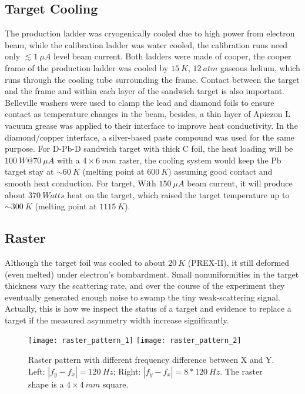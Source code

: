 \subsection{Target Cooling}
The production ladder was cryogenically cooled due to high power from electron beam,
while the calibration ladder was water cooled, the calibration runs need only
$\lesssim 1\ \mu A$ level beam current. Both ladders were made of cooper,
the cooper frame of the production ladder was cooled by $15\ K$, $12\ atm$ gaseous helium, 
which runs through the cooling tube surrounding the frame.
Contact between the target and the frame and within each layer of the \Pb sandwich
target is also important. Belleville washers were used to clamp the lead and 
diamond foils to ensure contact as temperature changes in the beam, besides, 
a thin layer of Apiezon L vacuum grease was applied to their interface to improve 
heat conductivity. In the diamond/copper interface, a silver-based paste compound
was used for the same purpose.
For D-Pb-D sandwich target with thick C foil, the heat loading will be $100\ W@70\ \mu A$
with a $4\times 6 \ mm$ raster, the cooling system would keep the Pb target stay at
$\sim60\ K$ (melting point at $600 \ K$) assuming good contact and smooth heat
conduction. For \Ca target, With $150\ \mu A$ beam current, 
it will produce about $370\ Watts$ heat on the target, which raised the target temperature 
up to $\sim300\ K$ (melting point at $1115\ K$).


\subsection{Raster}
Although the target foil was cooled to about $20\ K$ (PREX-II), it still deformed (even melted)
under electron's bombardment. Small nonuniformities in the target 
thickness vary the scattering rate, and over the course of the experiment they 
eventually generated enough noise to swamp the tiny weak-scattering signal.
Actually, this is how we inspect the status of a target and evidence to
replace a target if the measured asymmetry width increase significantly.

\begin{figure}
    \centering
    \texttt{[image: raster\_pattern\_1]}
    \texttt{[image: raster\_pattern\_2]}
    \caption{Raster pattern with different frequency difference between X and Y.
    Left: $|f_y - f_x| = 120\ Hz$; Right: $|f_y - f_x| = 8*120\ Hz$. The raster
    shape is a $4\times 4\ mm$ square.} 
    \label{fig:raster_pattern}
\end{figure}

